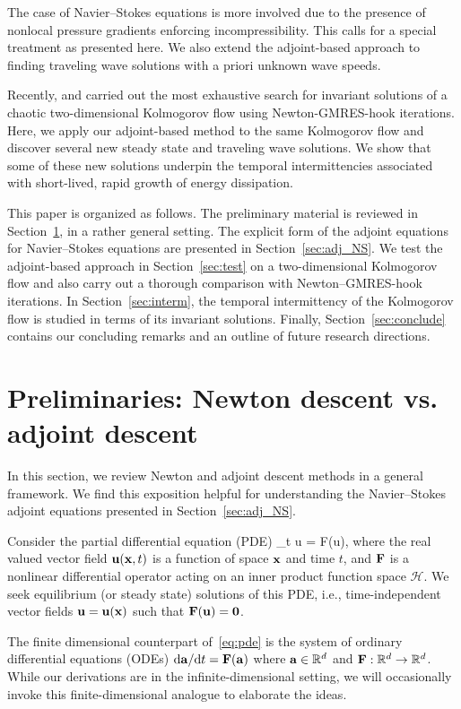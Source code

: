 \documentclass{jfm}
\begin{document}
The case of
Navier--Stokes equations is more involved due to
the presence of nonlocal pressure
gradients enforcing incompressibility. This calls for a special treatment
as presented here. We also extend the adjoint-based approach to finding
traveling wave solutions with a priori unknown wave speeds.

Recently, and carried out the most exhaustive search for invariant solutions
of a chaotic two-dimensional Kolmogorov flow using Newton-GMRES-hook iterations.
Here, we apply our adjoint-based method to the same Kolmogorov flow and discover several
new steady state and traveling wave solutions. We show that some of these new
solutions underpin the temporal intermittencies associated with
short-lived, rapid growth of energy dissipation. 

This paper is organized as follows. The preliminary material is reviewed in
Section~\ref{sec:prelim}, in a rather general setting. The explicit form of the
adjoint equations for Navier--Stokes equations are presented in
Section~\ref{sec:adj_NS}. We test the adjoint-based approach in Section~\ref{sec:test}
on a two-dimensional Kolmogorov flow
and also carry out a thorough comparison with Newton--GMRES-hook iterations.
In Section~\ref{sec:interm}, the temporal intermittency of the Kolmogorov flow is
studied in terms of its invariant solutions. Finally, Section~\ref{sec:conclude} contains
our concluding remarks and an outline of future research directions.




\section{Preliminaries: Newton descent vs. adjoint descent}\label{sec:prelim}
In this section, we review Newton and adjoint descent methods
in a general framework.
We find this exposition helpful for
understanding the Navier--Stokes adjoint
equations presented in Section~\ref{sec:adj_NS}.

Consider the partial differential equation (PDE)
\beq
\partial_t \vc u = \vc F(\vc u),
\label{eq:pde}
\eeq
where the real valued vector field
$\mathbf u(\mathbf x,t)$ is a function of space $\mathbf x$ and time $t$, and
$\mathbf F$ is a nonlinear differential operator acting on an inner product function space
$\mathcal H$. We seek equilibrium (or steady state) solutions of this PDE, i.e.,
time-independent vector fields $\mathbf u=\mathbf u(\mathbf x)$ such that $\mathbf F(\mathbf u)=\mathbf 0$.

The finite dimensional counterpart of~\eqref{eq:pde} is the system of ordinary differential
equations (ODEs) $\mbox d\mathbf a/\mbox d t=\mathbf F(\mathbf a)$ where $\mathbf a\in\mathbb R^d$ and
$\mathbf F:\mathbb R^d\to\mathbb R^d$. While our derivations are in the infinite-dimensional setting,
we will occasionally invoke this finite-dimensional analogue to elaborate the ideas.
\end{document}
